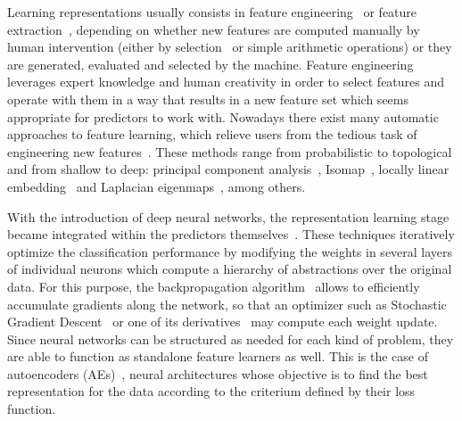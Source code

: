 Learning representations usually consists in feature engineering~\cite{domingos-useful} or feature extraction~\cite{featext}, depending on whether new features are computed manually by human intervention (either by selection~\cite{dash1997feature} or simple arithmetic operations) or they are generated, evaluated and selected by the machine. Feature engineering leverages expert knowledge and human creativity in order to select features and operate with them in a way that results in a new feature set which seems appropriate for predictors to work with. Nowadays there exist many automatic approaches to feature learning, which relieve users from the tedious task of engineering new features~\cite{bengio}. These methods range from probabilistic to topological and from shallow to deep: principal component analysis~\cite{PCABook}, Isomap~\cite{Isomap}, locally linear embedding~\cite{LLE} and Laplacian eigenmaps~\cite{LaplacianEigenmaps}, among others.

With the introduction of deep neural networks, the representation learning stage became integrated within the predictors themselves~\cite{lecun-dl}. These techniques iteratively optimize the classification performance by modifying the weights in several layers of individual neurons which compute a hierarchy of abstractions over the original data. For this purpose, the backpropagation algorithm~\cite{rumelhart1988learning} allows to efficiently accumulate gradients along the network, so that an optimizer such as Stochastic Gradient Descent~\cite{robbins1951stochastic} or one of its derivatives~\cite{duchi2011adaptive,zeiler2012adadelta,kingma2015adam,tieleman2012lecture} may compute each weight update. Since neural networks can be structured as needed for each kind of problem, they are able to function as standalone feature learners as well. This is the case of autoencoders (AEs)~\cite{charte-tutorial}, neural architectures whose objective is to find the best representation for the data according to the criterium defined by their loss function.

